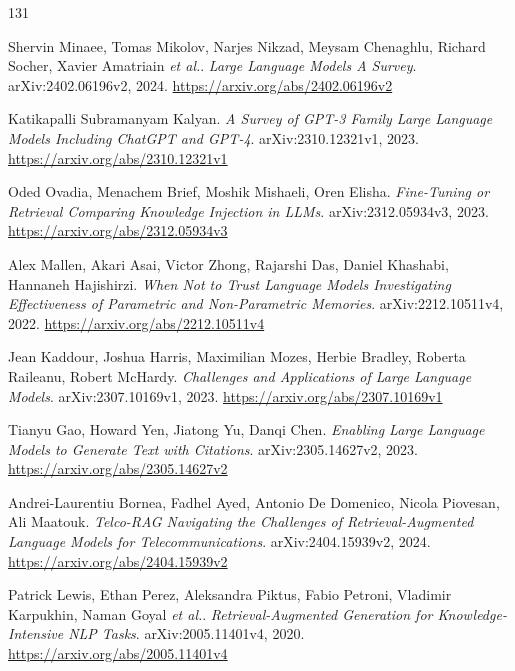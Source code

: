 \documentclass[11pt,a4paper]{article}
\begin{document}
\begin{thebibliography}{131}
\setlength{\itemsep}{2pt}

Shervin Minaee, Tomas Mikolov, Narjes Nikzad, Meysam Chenaghlu, Richard Socher, Xavier Amatriain \emph{et al.}.
\newblock \emph{Large Language Models A Survey}.
\newblock arXiv:2402.06196v2, 2024.
\newblock \url{https://arxiv.org/abs/2402.06196v2}

Katikapalli Subramanyam Kalyan.
\newblock \emph{A Survey of GPT-3 Family Large Language Models Including ChatGPT and GPT-4}.
\newblock arXiv:2310.12321v1, 2023.
\newblock \url{https://arxiv.org/abs/2310.12321v1}

Oded Ovadia, Menachem Brief, Moshik Mishaeli, Oren Elisha.
\newblock \emph{Fine-Tuning or Retrieval Comparing Knowledge Injection in LLMs}.
\newblock arXiv:2312.05934v3, 2023.
\newblock \url{https://arxiv.org/abs/2312.05934v3}

Alex Mallen, Akari Asai, Victor Zhong, Rajarshi Das, Daniel Khashabi, Hannaneh Hajishirzi.
\newblock \emph{When Not to Trust Language Models Investigating Effectiveness of Parametric and Non-Parametric Memories}.
\newblock arXiv:2212.10511v4, 2022.
\newblock \url{https://arxiv.org/abs/2212.10511v4}

Jean Kaddour, Joshua Harris, Maximilian Mozes, Herbie Bradley, Roberta Raileanu, Robert McHardy.
\newblock \emph{Challenges and Applications of Large Language Models}.
\newblock arXiv:2307.10169v1, 2023.
\newblock \url{https://arxiv.org/abs/2307.10169v1}

Tianyu Gao, Howard Yen, Jiatong Yu, Danqi Chen.
\newblock \emph{Enabling Large Language Models to Generate Text with Citations}.
\newblock arXiv:2305.14627v2, 2023.
\newblock \url{https://arxiv.org/abs/2305.14627v2}

Andrei-Laurentiu Bornea, Fadhel Ayed, Antonio De Domenico, Nicola Piovesan, Ali Maatouk.
\newblock \emph{Telco-RAG Navigating the Challenges of Retrieval-Augmented Language Models for Telecommunications}.
\newblock arXiv:2404.15939v2, 2024.
\newblock \url{https://arxiv.org/abs/2404.15939v2}

Patrick Lewis, Ethan Perez, Aleksandra Piktus, Fabio Petroni, Vladimir Karpukhin, Naman Goyal \emph{et al.}.
\newblock \emph{Retrieval-Augmented Generation for Knowledge-Intensive NLP Tasks}.
\newblock arXiv:2005.11401v4, 2020.
\newblock \url{https://arxiv.org/abs/2005.11401v4}


\end{thebibliography}
\end{document}
